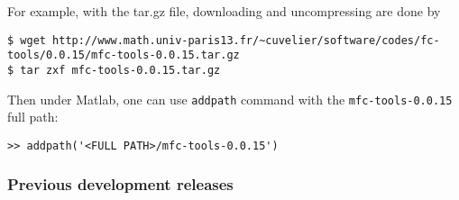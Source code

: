 For example, with the tar.gz file, downloading and uncompressing are done by 
\begin{verbatim}
$ wget http://www.math.univ-paris13.fr/~cuvelier/software/codes/fc-tools/0.0.15/mfc-tools-0.0.15.tar.gz
$ tar zxf mfc-tools-0.0.15.tar.gz
\end{verbatim}
Then under Matlab, one can use \texttt{addpath} command with the \texttt{mfc-tools-0.0.15} full path:
\begin{verbatim}
>> addpath('<FULL PATH>/mfc-tools-0.0.15')
\end{verbatim}
 
\subsubsection{Previous development releases}

